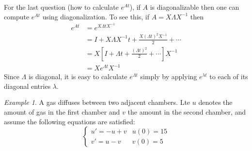 \documentclass[11pt,oneside]{amsbook}
\theoremstyle{definition}
\theoremstyle{plain}
\theoremstyle{definition}
\theoremstyle{remark}
\newtheorem{example}[theorem]{Example}
\numberwithin{equation}{section}
\numberwithin{figure}{section}
\begin{document}
For the last question (how to calculate $e^{At}$), if $A$ is diagonalizable then one can compute $e^{At}$ using diagonalization. To see this, if $A=X\Lambda X^{-1}$ then
\begin{align*}
  e^{At}&=e^{X\Lambda t X^{-1}}\\
        &=I+X\Lambda X^{-1}t+\frac{X(\Lambda t)^2X^{-1}}{2}+\cdots\\
        &=X\left[I+\Lambda t+\frac{(\Lambda t)^2}{2}+\cdots\right]X^{-1}\\
        &=Xe^{\Lambda t}X^{-1}
\end{align*}
Since $\Lambda$ is diagonal, it is easy to calculate $e^{\Lambda t}$ simply by applying $e^{\lambda t}$ to each of its diagonal entries $\lambda$.

\begin{example}
  A gas diffuses between two adjacent chambers. Lte $u$ denotes the amount of gas in the first chamber and $v$ the amount in the second chamber, and assume the following equations are satisfied:
  \[\begin{cases}
      u'=-u+v & u(0)=15\\
      v'=u-v & v(0)=5
    \end{cases}
  \]
  

\end{example}
\end{document}
